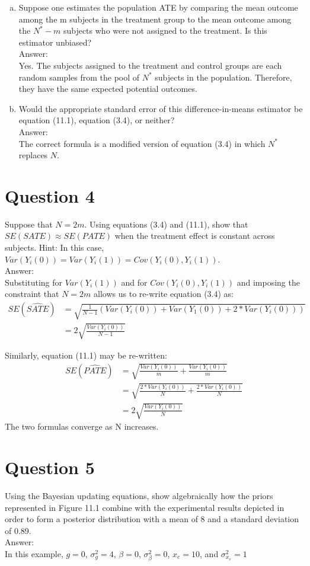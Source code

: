 \documentclass[11pt,notitlepage]{article}\usepackage[]{graphicx}\usepackage[]{color}
\begin{document}
\begin{enumerate}[a)]
\item Suppose one estimates the population ATE by comparing the mean outcome among the m subjects in the treatment group to the mean outcome among the $N^* - m$ subjects who were not assigned to the treatment. Is this estimator unbiased?\\
Answer:\\
Yes. The subjects assigned to the treatment and control groups are each random samples from the pool of $N^*$ subjects in the population.  Therefore, they have the same expected potential outcomes.
\item Would the appropriate standard error of this difference-in-means estimator be equation (11.1), equation (3.4), or neither?\\
Answer:\\
The correct formula is a modified version of equation (3.4) in which $N^*$ replaces $N$.
\end{enumerate}


\section*{Question 4}
Suppose that $N = 2m$. Using equations (3.4) and (11.1), show that $SE(SATE) \approx SE(PATE)$ when the treatment effect is constant across subjects. Hint: In this case, $Var(Y_i(0)) = Var(Y_i(1)) = Cov(Y_i(0),Y_i(1))$.\\
Answer:\\
Substituting for $Var(Y_i (1))$ and for $Cov(Y_i (0),Y_i (1))$ and imposing the constraint that $N = 2m$ allows us to re-write equation (3.4) as:
\begin{align*}
SE(\widehat{SATE}) &= \sqrt{\frac{1}{N-1}(Var(Y_i(0)) + Var(Y_1(0)) + 2*Var(Y_i(0)))}\\
&=2\sqrt{\frac{Var(Y_i(0))}{N-1}}
\end{align*}

Similarly, equation (11.1) may be re-written:
\begin{align*}
SE(\widehat{PATE}) &= \sqrt{\frac{Var(Y_i(0))}{m} + \frac{Var(Y_i(0))}{m}}\\
&= \sqrt{\frac{2*Var(Y_i(0))}{N} + \frac{2*Var(Y_i(0))}{N}}\\
&= 2\sqrt{\frac{Var(Y_i(0))}{N}}
\end{align*}
The two formulas converge as N increases.

\section*{Question 5}
Using the Bayesian updating equations, show algebraically how the priors represented in Figure 11.1 combine with the experimental results depicted in order to form a posterior distribution with a mean of 8 and a standard deviation of 0.89.\\
Answer:\\
In this example, $g=0$, $\sigma^2_g = 4$, $\beta = 0$, $\sigma^2_{\beta} = 0$, $x_e = 10$, and $\sigma^2_{x_e} = 1$
\end{document}
